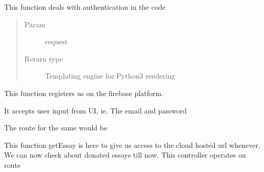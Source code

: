 \documentclass[letterpaper,10pt,english]{sphinxmanual}
\begin{document}

\begin{fulllineitems}
\label{\detokenize{main:main.firebase_login}}
This function deals with authentication in the code
\begin{quote}\begin{description}
\item[{Param}] \leavevmode
request

\item[{Return type}] \leavevmode

Templating engine for Python3 rendering

\begin{sphinxVerbatim}[commandchars=\\\{\}]
  
\end{sphinxVerbatim}


\end{description}\end{quote}

\end{fulllineitems}


\begin{fulllineitems}
\label{\detokenize{main:main.firebase_register}}
This function registers us on the firebase platform.

It accepts user input from UI, ie. The email and password

The route for the same would be 

\end{fulllineitems}


\begin{fulllineitems}
\label{\detokenize{main:main.getEssay}}
This function getEssay is here to give us access to the cloud hosted url whenever. We can now check about donated essays till now.
This controller operates on route 

\end{fulllineitems}
\end{document}
